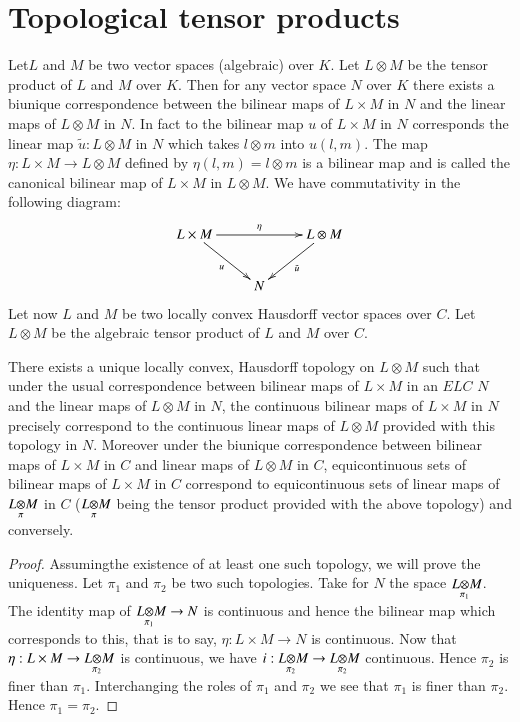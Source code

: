 
\chapter{Topological tensor products}\label{chap12}

Let\pageoriginale $L$ and $M$ be two vector spaces (algebraic) over $K$. 
Let $L\otimes M$ be the tensor product of $L$ and $M$ over $K$. Then for
any vector space $N$ over $K$ there exists a biunique correspondence
between the bilinear maps of $L \times M$ in $N$ and the linear maps
of $L \otimes M$ in $N$. In fact to the bilinear map $u$ of $L\times
M$ in $N$ corresponds the linear map $\tilde{u} : L \otimes M$ in $N$
which takes $l \otimes m$ into $u(l, m)$. The map $\eta : L \times M
\to L \otimes M$ defined by $\eta (l, m) = l \otimes m$ is a bilinear
map and is called the canonical bilinear map of $L \times M$ in $L
\otimes M$. We have commutativity in the following diagram:
\[
\xymatrix{
L \times M\ar[rr]^\eta \ar[dr]_{u} & & L \otimes M \ar[dl]^{\tilde{u}}\\
& N &
}
\]
Let now $L$ and $M$ be two locally convex Hausdorff vector spaces over
$C$. Let $L \otimes M$ be the algebraic tensor product of $L$ and $M$
over $C$.
\setcounter{section}{12}
\setcounter{theorem}{0}
\begin{theorem}\label{chap12:thm12.1}
There exists a unique locally convex, Hausdorff topology on $L \otimes
M$ such that under the usual correspondence between bilinear maps of
$L \times M$ in an $E L C$ $N$ and the linear maps of $L \otimes M$ in
$N$, the continuous bilinear maps of $L \times M$ in $N$ precisely
correspond to the continuous linear maps of $L \otimes M$ provided
with this topology in $N$. Moreover under the biunique correspondence
between bilinear maps of $L \times M$ in $C$ and linear maps of $L
\otimes M$ in $C$, equicontinuous sets of bilinear maps of $L \times
M$ in $C$ correspond to equicontinuous sets of linear maps of $\fibreoproduct
{L}{M}{\pi}$ in $C$ ($\fibreoproduct{L}{M}{\pi}$ being the tensor product
provided with the above topology) and conversely.
\end{theorem}

\begin{proof}
Assuming\pageoriginale the existence of at least one such topology, we will 
prove the uniqueness. Let $\pi_1$ and $\pi_2$ be two such topologies. Take
for $N$ the space $\fibreoproduct{L}{M}{\pi_1}$. The identity map
of $\fibreoproduct{L}{M}{\pi_1} \to N$ is continuous and hence the
bilinear map which corresponds to this, that is to say, $\eta : L
\times M \to N$ is continuous. Now that $\eta : L \times M \to 
\fibreoproduct{L}{M}{\pi_2}$ is continuous, we have $i : 
\fibreoproduct{L}{M}{\pi_2}\to\fibreoproduct{L}{M}{\pi_2}$
continuous. Hence $\pi_2$ is finer than $\pi_1$. Interchanging the
roles of $\pi_1$ and $\pi_2$ we see that $\pi_1$ is finer than
$\pi_2$. Hence $\pi_1 = \pi_2$.
\end{proof}

